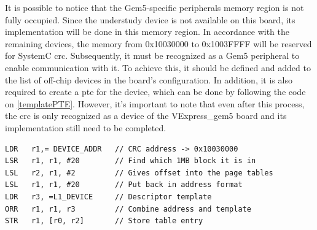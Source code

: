 It is possible to notice that the Gem5-specific peripherals memory region is not fully occupied. Since the understudy device is 
not available on this board, its implementation will be done in this memory region. In accordance with the remaining devices, 
the memory from 0x10030000 to 0x1003FFFF will be reserved for SystemC \gls{crc}. Subsequently, it must be recognized as a Gem5 
peripheral to enable communication with it. To achieve this, it should be defined and added to the list of off-chip devices in the 
board's configuration. In addition, it is also required to create a \gls{pte} for the device, which can be done by following the
code on \ref{templatePTE}. However, it's important to note that even after this process, the \gls{crc} is only recognized as a device of the 
VExpress\_gem5 board and its implementation still need to be completed.

\hspace{1cm}

\begin{lstlisting}[style=customasm, caption={Template for a \gls{pte}}, label=templatePTE]
LDR   r1,= DEVICE_ADDR	 // CRC address -> 0x10030000
LSR   r1, r1, #20        // Find which 1MB block it is in
LSL   r2, r1, #2         // Gives offset into the page tables
LSL   r1, r1, #20        // Put back in address format
LDR   r3, =L1_DEVICE     // Descriptor template
ORR   r1, r1, r3         // Combine address and template
STR   r1, [r0, r2]       // Store table entry
\end{lstlisting}


